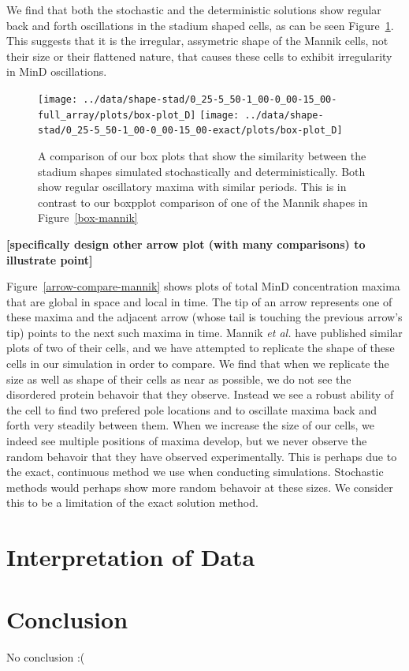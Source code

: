 \documentclass[letterpaper,twocolumn,amsmath,amssymb,pre]{revtex4-1}
\newcommand{\red}[1]{{\bf \color{red} #1}}
\newcommand{\fixme}[1]{\red{[#1]}}
\begin{document}
We find that both the stochastic and the deterministic solutions show
regular back and forth oscillations in the stadium shaped cells, as
can be seen Figure~\ref{box-stadium}.  This suggests that it is the
irregular, assymetric shape of the Mannik cells, not their size or
their flattened nature, that causes these cells to exhibit
irregularity in MinD oscillations.

\begin{figure}
  \texttt{[image: ../data/shape-stad/0\_25-5\_50-1\_00-0\_00-15\_00-full\_array/plots/box-plot\_D]}
  \texttt{[image: ../data/shape-stad/0\_25-5\_50-1\_00-0\_00-15\_00-exact/plots/box-plot\_D]}
  \caption{A comparison of our box plots that show the similarity
    between the stadium shapes simulated stochastically and
    deterministically.  Both show regular oscillatory maxima with
    similar periods.  This is in contrast to our boxpplot comparison
    of one of the Mannik shapes in Figure~\ref{box-mannik}}
  \label{box-stadium}
\end{figure}


\fixme{specifically design other arrow plot (with many comparisons) to
  illustrate point}


Figure~\ref{arrow-compare-mannik} shows plots of total MinD
concentration maxima that are global in space and local in time.  The
tip of an arrow represents one of these maxima and the adjacent arrow
(whose tail is touching the previous arrow's tip) points to the next
such maxima in time.  Mannik \emph{et al.} have published similar
plots of two of their cells, and we have attempted to replicate the
shape of these cells in our simulation in order to compare.  We find
that when we replicate the size as well as shape of their cells as
near as possible, we do not see the disordered protein behavoir that
they observe.  Instead we see a robust ability of the cell to find two
prefered pole locations and to oscillate maxima back and forth very
steadily between them.  When we increase the size of our cells, we
indeed see multiple positions of maxima develop, but we never observe
the random behavoir that they have observed experimentally.  This is
perhaps due to the exact, continuous method we use when conducting
simulations.  Stochastic methods would perhaps show more random
behavoir at these sizes.  We consider this to be a limitation of the
exact solution method.



\section{Interpretation of Data}
\section{Conclusion}
No conclusion :(

\end{document}
